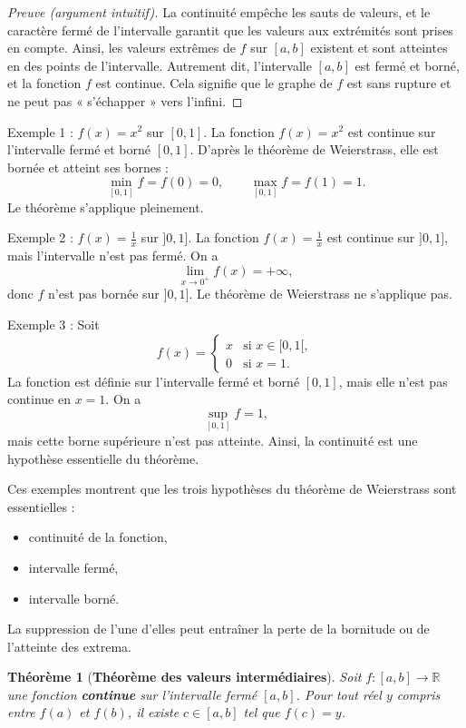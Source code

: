 \documentclass{report} %
\theoremstyle{definition}  %
\theoremstyle{plain} %
\newtheorem{theorem}{Théorème}[chapter]
\theoremstyle{remark} %
\begin{document}
\begin{proof}[Preuve (argument intuitif)]
La continuité empêche les sauts de valeurs, et le caractère fermé de
l’intervalle garantit que les valeurs aux extrémités sont prises en compte.
Ainsi, les valeurs extrêmes de \(f\) sur \([a,b]\) existent et sont atteintes
en des points de l’intervalle. Autrement dit, l’intervalle \([a,b]\) est fermé et borné, et la fonction \(f\) est continue.
Cela signifie que le graphe de \(f\) est sans rupture et ne peut pas
« s’échapper » vers l’infini.
\end{proof}


\medskip


\noindent
Exemple 1 : \(f(x) = x^2\) sur \([0,1]\).
La fonction \(f(x) = x^2\) est continue sur l’intervalle fermé et borné \([0,1]\).  
D’après le théorème de Weierstrass, elle est bornée et atteint ses bornes :
\[
\min_{[0,1]} f = f(0) = 0, 
\qquad
\max_{[0,1]} f = f(1) = 1.
\]
Le théorème s’applique pleinement.
\medskip

\noindent
Exemple 2 : \(f(x) = \frac{1}{x}\) sur \(]0,1]\).
La fonction \(f(x) = \frac{1}{x}\) est continue sur \(]0,1]\), mais l’intervalle n’est pas fermé.  
On a
\[
\lim_{x \to 0^+} f(x) = +\infty,
\]
donc \(f\) n’est pas bornée sur \(]0,1]\).  
Le théorème de Weierstrass ne s’applique pas.
\medskip

\noindent
Exemple 3 :
Soit
\[
f(x) =
\begin{cases}
x & \text{si } x \in [0,1[, \\
0 & \text{si } x = 1.
\end{cases}
\]
La fonction est définie sur l’intervalle fermé et borné \([0,1]\), mais elle n’est pas continue en \(x=1\).  
On a
\[
\sup_{[0,1]} f = 1,
\]
mais cette borne supérieure n’est pas atteinte.  
Ainsi, la continuité est une hypothèse essentielle du théorème.

\medskip
\noindent
Ces exemples montrent que les trois hypothèses du théorème de Weierstrass sont essentielles :
\begin{itemize}
\item continuité de la fonction,
\item intervalle fermé,
\item intervalle borné.
\end{itemize}
La suppression de l’une d’elles peut entraîner la perte de la bornitude ou de l’atteinte des extrema.

\medskip



\begin{theorem}[\textbf{Théorème des valeurs intermédiaires}]
Soit \( f : [a, b] \to \mathbb{R} \) une fonction \textbf{continue} sur l'intervalle fermé \([a, b]\). Pour tout réel \( y \) compris entre \( f(a) \) et \( f(b) \), il existe \( c \in [a, b] \) tel que \( f(c) = y \).
\end{theorem}
\end{document}
